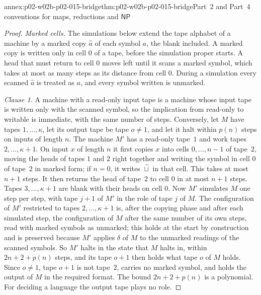 \begin{annexitem}{annex:p02-w02b-p02-015-bridge}{thm:p02-w02b-p02-015-bridge}{Part~2 and Part~4 conventions for maps, reductions and \(\mathsf{NP}\)}
\begin{proof}
\emph{Marked cells.}  The simulations below extend the tape alphabet of a
machine by a marked copy \(\hat a\) of each symbol \(a\), the blank included.
A marked copy is written only in cell \(0\) of a tape, before the
simulation proper starts.  A head that must return to cell \(0\) moves left
until it scans a marked symbol, which takes at most as many steps as its
distance from cell \(0\).  During a simulation every scanned \(\hat a\) is
treated as \(a\), and every symbol written is unmarked.

\emph{Clause 1.}  A machine with a read-only input tape is a machine whose
input tape is written only with the scanned symbol, so the implication from
read-only to writable is immediate, with the same number of steps.
Conversely, let \(M\) have tapes \(1,\ldots,\kappa\), let its output tape be
tape \(o\neq1\), and let it halt within \(p(n)\) steps on inputs of length
\(n\).  The machine \(M'\) has a read-only tape~\(1\) and work tapes
\(2,\ldots,\kappa+1\).  On input \(x\) of length \(n\) it first copies
\(x\) into cells \(0,\ldots,n-1\) of tape~\(2\), moving the heads of tapes
\(1\) and \(2\) right together and writing the symbol in cell \(0\) of
tape~\(2\) in marked form; if \(n=0\), it writes \(\hat\sqcup\) in that cell.
This takes at most \(n+1\) steps.  It then returns the head of tape~\(2\) to
cell \(0\) in at most \(n+1\) steps.  Tapes \(3,\ldots,\kappa+1\) are blank
with their heads on cell \(0\).  Now \(M'\) simulates \(M\) one step per
step, with tape \(j+1\) of \(M'\) in the role of tape \(j\) of \(M\).  The
configuration of \(M'\) restricted to tapes \(2,\ldots,\kappa+1\) is, after
the copying phase and after each simulated step, the configuration of \(M\)
after the same number of its own steps, read with marked symbols as
unmarked; this holds at the start by construction and is preserved because
\(M'\) applies \(\delta\) of \(M\) to the unmarked readings of the scanned
symbols.  So \(M'\) halts in the state that \(M\) halts in, within
\(2n+2+p(n)\) steps, and its tape \(o+1\) then holds what tape \(o\) of \(M\)
holds.  Since \(o\neq1\), tape \(o+1\) is not tape~\(2\), carries no marked
symbol, and holds the output of \(M\) in the required format.  The bound
\(2n+2+p(n)\) is a polynomial.  For deciding a language the output tape plays no role.


\end{proof}
\end{annexitem}
